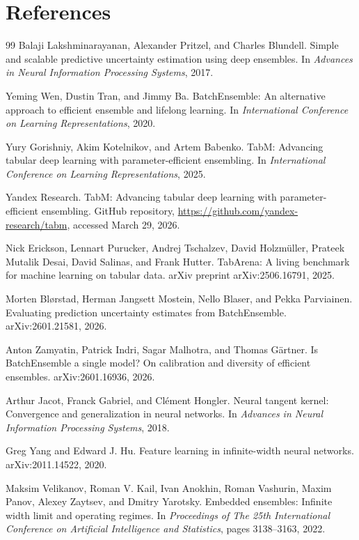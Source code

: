 \documentclass{article}
\begin{document}

\section*{References}

\begin{thebibliography}{99}
Balaji Lakshminarayanan, Alexander Pritzel, and Charles Blundell.
\newblock Simple and scalable predictive uncertainty estimation using deep ensembles.
\newblock In \emph{Advances in Neural Information Processing Systems}, 2017.

Yeming Wen, Dustin Tran, and Jimmy Ba.
\newblock BatchEnsemble: An alternative approach to efficient ensemble and lifelong learning.
\newblock In \emph{International Conference on Learning Representations}, 2020.

Yury Gorishniy, Akim Kotelnikov, and Artem Babenko.
\newblock TabM: Advancing tabular deep learning with parameter-efficient ensembling.
\newblock In \emph{International Conference on Learning Representations}, 2025.

Yandex Research.
\newblock TabM: Advancing tabular deep learning with parameter-efficient ensembling.
\newblock GitHub repository, \url{https://github.com/yandex-research/tabm}, accessed March 29, 2026.

Nick Erickson, Lennart Purucker, Andrej Tschalzev, David Holzm\"uller, Prateek Mutalik Desai, David Salinas, and Frank Hutter.
\newblock TabArena: A living benchmark for machine learning on tabular data.
\newblock arXiv preprint arXiv:2506.16791, 2025.

Morten Bl{\o}rstad, Herman Jangsett Mostein, Nello Blaser, and Pekka Parviainen.
\newblock Evaluating prediction uncertainty estimates from BatchEnsemble.
\newblock arXiv:2601.21581, 2026.

Anton Zamyatin, Patrick Indri, Sagar Malhotra, and Thomas G{\"a}rtner.
\newblock Is BatchEnsemble a single model? On calibration and diversity of efficient ensembles.
\newblock arXiv:2601.16936, 2026.

Arthur Jacot, Franck Gabriel, and Cl{\'e}ment Hongler.
\newblock Neural tangent kernel: Convergence and generalization in neural networks.
\newblock In \emph{Advances in Neural Information Processing Systems}, 2018.

Greg Yang and Edward J. Hu.
\newblock Feature learning in infinite-width neural networks.
\newblock arXiv:2011.14522, 2020.

Maksim Velikanov, Roman V. Kail, Ivan Anokhin, Roman Vashurin, Maxim Panov, Alexey Zaytsev, and Dmitry Yarotsky.
\newblock Embedded ensembles: Infinite width limit and operating regimes.
\newblock In \emph{Proceedings of The 25th International Conference on Artificial Intelligence and Statistics}, pages 3138--3163, 2022.
\end{thebibliography}
\end{document}
